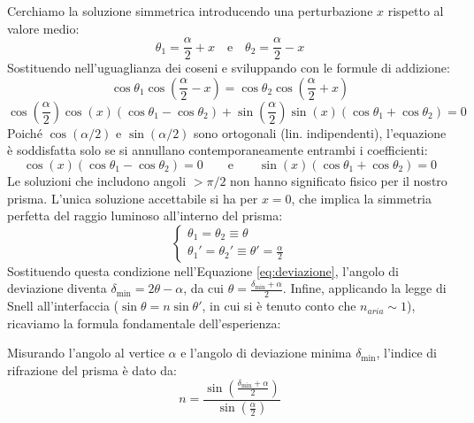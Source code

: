 \documentclass[openany,a4paper,12pt]{book}
\begin{document}
Cerchiamo la soluzione simmetrica introducendo una perturbazione $x$ rispetto al valore medio:
\begin{equation}
    \theta_1 = \frac{\alpha}{2} + x \quad \text{e} \quad \theta_2 = \frac{\alpha}{2} - x 
\end{equation}
Sostituendo nell'uguaglianza dei coseni e sviluppando con le formule di addizione:
\begin{equation}
   \cos \theta_1 \cos\left( \frac{\alpha}{2} - x \right) = \cos \theta_2 \cos\left( \frac{\alpha}{2} + x \right)
\end{equation}
\begin{equation}
 \cos\left(\frac{\alpha}{2}\right) \cos(x) ( \cos \theta_1 - \cos \theta_2 ) + \sin\left(\frac{\alpha}{2}\right) \sin(x) ( \cos \theta_1 + \cos \theta_2 ) = 0
\end{equation}
Poiché $\cos(\alpha/2)$ e $\sin(\alpha/2)$ sono ortogonali (lin. indipendenti), l'equazione è soddisfatta solo se si annullano contemporaneamente entrambi i coefficienti:
\begin{equation}
    \cos(x) (\cos \theta_1 - \cos \theta_2)= 0 \qquad \text{e} \qquad \sin(x) (\cos \theta_1 + \cos \theta_2)= 0
\end{equation}
Le soluzioni che includono angoli $>\pi/2$ non hanno significato fisico per il nostro prisma. L'unica soluzione accettabile si ha per $x=0$, che implica la simmetria perfetta del raggio luminoso all'interno del prisma:
\begin{equation}
    \begin{cases}
        \theta_1 = \theta_2 \equiv \theta\\
        \theta_1' = \theta_2' \equiv \theta' = \frac{\alpha}{2}
    \end{cases}
\end{equation}
Sostituendo questa condizione nell'Equazione \ref{eq:deviazione}, l'angolo di deviazione diventa $\delta_{\text{min}} = 2\theta - \alpha$, da cui $\theta = \frac{\delta_{\text{min}} + \alpha}{2}$. Infine, applicando la legge di Snell all'interfaccia ($\sin \theta = n \sin \theta'$, in cui si è tenuto conto che $n_{aria} \sim 1$), ricaviamo la formula fondamentale dell'esperienza:
\begin{definizione}[title=Indice di rifrazione tramite deviazione minima]
Misurando l'angolo al vertice $\alpha$ e l'angolo di deviazione minima $\delta_{\text{min}}$, l'indice di rifrazione del prisma è dato da:
\begin{equation}
    n = \frac{\sin\left(\frac{\delta_{\text{min}} + \alpha}{2}\right)}{\sin\left(\frac{\alpha}{2}\right)}
\end{equation}    
\end{definizione}
\end{document}
